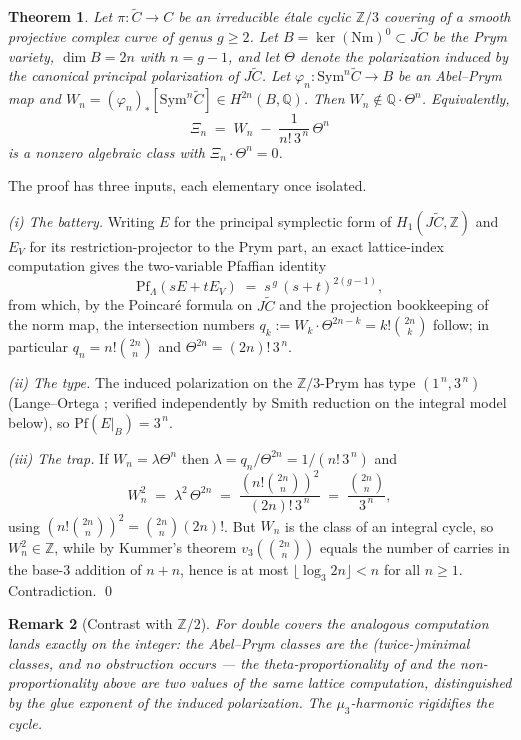 \documentclass[11pt]{article}
\newtheorem{theorem}{Theorem}
\newtheorem{remark}[theorem]{Remark}
\newcommand{\Z}{\mathbb{Z}}
\newcommand{\Q}{\mathbb{Q}}
\newcommand{\Pf}{\mathrm{Pf}}
\begin{document}
\begin{theorem}\label{main}
Let $\pi\colon\widetilde C\to C$ be an irreducible \'etale cyclic $\Z/3$
covering of a smooth projective complex curve of genus $g\ge 2$.  Let
$B=\ker(\mathrm{Nm})^0\subset J\widetilde C$ be the Prym variety,
$\dim B=2n$ with $n=g-1$, and let $\Theta$ denote the polarization induced by
the canonical principal polarization of $J\widetilde C$.  Let
$\varphi_n\colon\mathrm{Sym}^n\widetilde C\to B$ be an Abel--Prym map and
$W_n=(\varphi_n)_*[\mathrm{Sym}^n\widetilde C]\in H^{2n}(B,\Q)$.
Then $W_n\notin \Q\cdot\Theta^n$.  Equivalently,
\[
\Xi_n \;=\; W_n \;-\; \frac{1}{n!\,3^{\,n}}\,\Theta^{n}
\]
is a nonzero algebraic class with $\Xi_n\cdot\Theta^{n}=0$.
\end{theorem}

The proof has three inputs, each elementary once isolated.

\emph{(i) The battery.}  Writing $E$ for the principal symplectic form of
$H_1(J\widetilde C,\Z)$ and $E_V$ for its restriction-projector to the Prym
part, an exact lattice-index computation gives the two-variable Pfaffian
identity
\[
\Pf_{\Lambda}(sE+tE_V) \;=\; s^{\,g}\,(s+t)^{2(g-1)},
\]
from which, by the Poincar\'e formula on $J\widetilde C$ and the projection
bookkeeping of the norm map, the intersection numbers
$q_k := W_k\cdot\Theta^{2n-k} = k!\binom{2n}{k}$ follow; in particular
$q_n=n!\binom{2n}{n}$ and $\Theta^{2n}=(2n)!\,3^{\,n}$.

\emph{(ii) The type.}  The induced polarization on the $\Z/3$-Prym has type
$(1^{\,n},3^{\,n})$ (Lange--Ortega \cite{LO11}; verified independently by
Smith reduction on the integral model below), so $\Pf(E|_B)=3^{\,n}$.

\emph{(iii) The trap.}  If $W_n=\lambda\Theta^n$ then
$\lambda = q_n/\Theta^{2n} = 1/(n!\,3^{\,n})$ and
\[
W_n^2 \;=\; \lambda^2\,\Theta^{2n} \;=\; \frac{(n!\binom{2n}{n})^2}{(2n)!\,3^{\,n}}
\;=\; \frac{\binom{2n}{n}}{3^{\,n}},
\]
using $(n!\binom{2n}{n})^2=\binom{2n}{n}(2n)!$.  But $W_n$ is the class of an
integral cycle, so $W_n^2\in\Z$, while by Kummer's theorem
$v_3\!\left(\binom{2n}{n}\right)$ equals the number of carries in the base-$3$
addition of $n+n$, hence is at most $\lfloor\log_3 2n\rfloor < n$ for all
$n\ge1$.  Contradiction. \qed

\begin{remark}[Contrast with $\Z/2$]
For double covers the analogous computation lands exactly on the integer:
the Abel--Prym classes are the (twice-)minimal classes, and no obstruction
occurs --- the theta-proportionality of \cite{Welters87,Beauville82} and the
non-proportionality above are two values of the same lattice computation,
distinguished by the glue exponent of the induced polarization.  The
$\mu_3$-harmonic rigidifies the cycle.
\end{remark}
\end{document}
